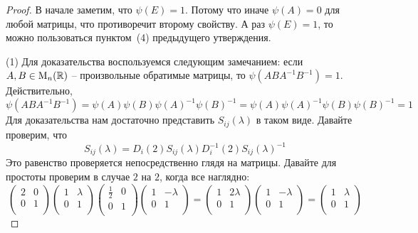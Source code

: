 \begin{proof}
В начале заметим, что $\psi(E) = 1$.
Потому что иначе $\psi(A) = 0$ для любой матрицы, что противоречит второму свойству.
А раз $\psi(E)=1$, то можно пользоваться пунктом~(4) предыдущего утверждения.

(1) Для доказательства воспользуемся следующим замечанием: если $A,B\in\operatorname{M}_{n}(\mathbb R)$ -- произвольные обратимые матрицы, то $\psi(ABA^{-1}B^{-1}) = 1$.
Действительно, 
\[
\psi(ABA^{-1}B^{-1}) = \psi(A)\psi(B)\psi(A)^{-1}\psi(B)^{-1}=\psi(A)\psi(A)^{-1}\psi(B)\psi(B)^{-1} = 1
\]
Для доказательства нам достаточно представить $S_{ij}(\lambda)$ в таком виде.
Давайте проверим, что 
\[
S_{ij}(\lambda) = D_i(2) S_{ij}(\lambda)D_i^{-1}(2)S_{ij}(\lambda)^{-1}
\]
Это равенство проверяется непосредственно глядя на матрицы.
Давайте для простоты проверим в случае $2$ на $2$, когда все наглядно:
\[
\begin{pmatrix}
{2}&{0}\\
{0}&{1}\\
\end{pmatrix}
\begin{pmatrix}
{1}&{\lambda}\\
{0}&{1}\\
\end{pmatrix}
\begin{pmatrix}
{\frac{1}{2}}&{0}\\
{0}&{1}\\
\end{pmatrix}
\begin{pmatrix}
{1}&{-\lambda}\\
{0}&{1}\\
\end{pmatrix}
=
\begin{pmatrix}
{1}&{2\lambda}\\
{0}&{1}\\
\end{pmatrix}
\begin{pmatrix}
{1}&{-\lambda}\\
{0}&{1}\\
\end{pmatrix}
=
\begin{pmatrix}
{1}&{\lambda}\\
{0}&{1}\\
\end{pmatrix}
\]


\end{proof}

